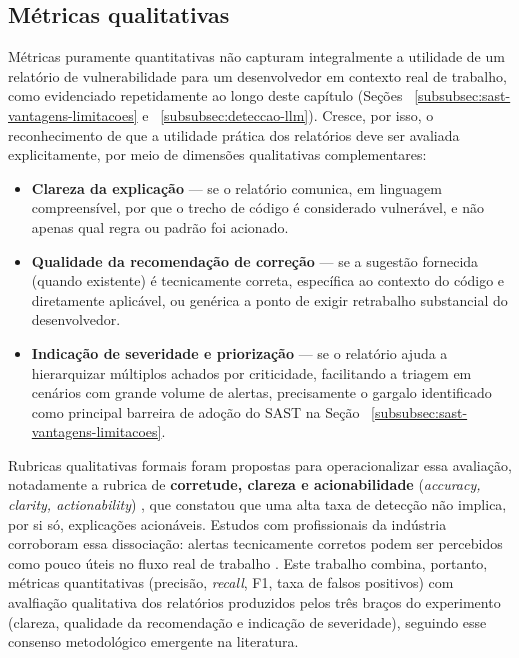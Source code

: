\subsection{Métricas qualitativas}\label{subsec:metricas-qualitativas}
Métricas puramente quantitativas não capturam integralmente a utilidade de um relatório de vulnerabilidade para um desenvolvedor em contexto real de trabalho, como evidenciado repetidamente ao longo deste capítulo (Seções ~\ref{subsubsec:sast-vantagens-limitacoes} e ~\ref{subsubsec:deteccao-llm}). Cresce, por isso, o reconhecimento de que a utilidade prática dos relatórios deve ser avaliada explicitamente, por meio de dimensões qualitativas complementares:

\begin{itemize}
\item \textbf{Clareza da explicação} — se o relatório comunica, em linguagem compreensível, por que o trecho de código é considerado vulnerável, e não apenas qual regra ou padrão foi acionado.
\item \textbf{Qualidade da recomendação de correção} — se a sugestão fornecida (quando existente) é tecnicamente correta, específica ao contexto do código e diretamente aplicável, ou genérica a ponto de exigir retrabalho substancial do desenvolvedor.
\item \textbf{Indicação de severidade e priorização} — se o relatório ajuda a hierarquizar múltiplos achados por criticidade, facilitando a triagem em cenários com grande volume de alertas, precisamente o gargalo identificado como principal barreira de adoção do SAST na Seção ~\ref{subsubsec:sast-vantagens-limitacoes}.
\end{itemize}
Rubricas qualitativas formais foram propostas para operacionalizar essa avaliação, notadamente a rubrica de \textbf{corretude, clareza e acionabilidade} (\textit{accuracy, clarity, actionability}) \cite{Mao2025ExplainableVD}, que constatou que uma alta taxa de detecção não implica, por si só, explicações acionáveis. Estudos com profissionais da indústria corroboram essa dissociação: alertas tecnicamente corretos podem ser percebidos como pouco úteis no fluxo real de trabalho \cite{Steenhoek2025IDEUserStudy, Li2025IndustrySAST}. Este trabalho combina, portanto, métricas quantitativas (precisão, \textit{recall}, F1, taxa de falsos positivos) com avalfiação qualitativa dos relatórios produzidos pelos três braços do experimento (clareza, qualidade da recomendação e indicação de severidade), seguindo esse consenso metodológico emergente na literatura.

